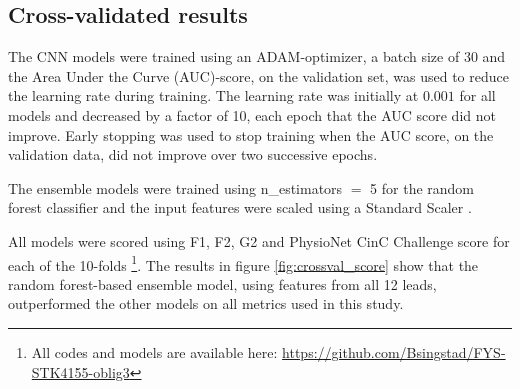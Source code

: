 \subsection{Cross-validated results}
The CNN models were trained using an ADAM-optimizer, a batch size of $30$ and the Area Under the Curve (AUC)-score, on the validation set, was used to reduce the learning rate during training. The learning rate was initially at $0.001$ for all models and decreased by a factor of 10, each epoch that the AUC score did not improve. Early stopping was used to stop training when the AUC score, on the validation data, did not improve over two successive epochs.

The ensemble models were trained using n\_estimators $=$ 5 for the random forest classifier and the input features were scaled using a Standard Scaler \cite{pedregosa_scikit-learn_2011}.

All models were scored using F1, F2, G2 and PhysioNet CinC Challenge score for each of the 10-folds \footnote{All codes and models are available here: \url{https://github.com/Bsingstad/FYS-STK4155-oblig3}}. The results in figure \ref{fig:crossval_score} show that the random forest-based ensemble model, using features from all 12 leads, outperformed the other models on all metrics used in this study. 



